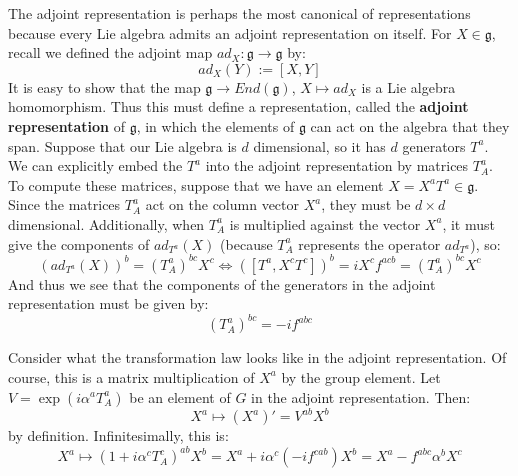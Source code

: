 \documentclass[11pt, oneside]{article}   	%
\theoremstyle{definition}
\begin{document}
The adjoint representation is perhaps the most canonical of representations because every Lie 
algebra admits an adjoint representation on itself. For $X\in\mathfrak g$, recall we defined the adjoint 
map $ad_X : \mathfrak g\rightarrow\mathfrak g$ by:
\begin{equation}
	ad_X(Y) := [X, Y]
\end{equation}
It is easy to show that the map $\mathfrak g\rightarrow End(\mathfrak g)$, $X\mapsto ad_X$ is a 
Lie algebra homomorphism. Thus this must define a representation, called the \textbf{adjoint 
representation} of $\mathfrak g$, in which the elements of $\mathfrak g$ can act on the algebra 
that they span. Suppose that our Lie algebra is $d$ dimensional, so it has $d$ generators $T^a$. 
We can explicitly embed the $T^a$ into the adjoint representation by matrices $T_A^a$. To 
compute these matrices, suppose that we have an element $X = X^a T^a\in\mathfrak g$. Since the 
matrices $T_A^a$ act on the column vector $X^a$, they must be $d\times d$ dimensional. Additionally, 
when $T_A^a$ is multiplied against the vector $X^a$, it must give the components of 
$ad_{T^a}(X)$ (because $T^a_A$ represents the operator $ad_{T^a}$), so:
\begin{equation}
	(ad_{T^a}(X))^b = (T_A^a)^{bc} X^c\iff ([T^a, X^c T^c])^b = iX^c f^{acb} = (T_A^a)^{bc} X^c
\end{equation}
And thus we see that the components of the generators in the adjoint representation must be given by:
\begin{equation}
	(T_A^a)^{bc} = -if^{abc}
\end{equation}

Consider what the transformation law looks like in the adjoint representation. Of course, this is 
a matrix multiplication of $X^a$ by the group element. Let $V = \exp(i\alpha^a T_A^a)$ be an element of 
$G$ in the adjoint representation. Then:
\begin{equation}
	X^a\mapsto (X^a)' = V^{ab}X^b
\end{equation}
by definition. Infinitesimally, this is:
\begin{equation}
	X^a\mapsto (1 + i\alpha^c T_A^c)^{ab} X^b = X^a + i\alpha^c (-if^{cab})X^b = X^a - 
	f^{abc}\alpha^b X^c
\end{equation}
\end{document}

